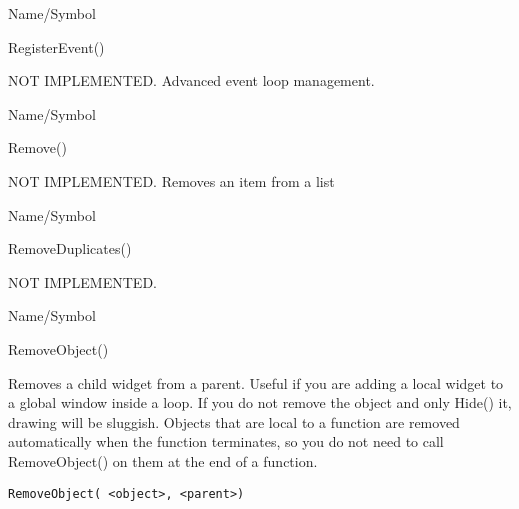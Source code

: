 \rl


\begin{desc}{Name/Symbol}
\item[Name/Symbol]  	RegisterEvent()

\item[Description]	NOT IMPLEMENTED.  Advanced event loop management.

\item[Usage]		

\item[Example]	

\item[See Also]	
\end{desc}

\rl






\begin{desc}{Name/Symbol}
\item[Name/Symbol]  	Remove()

\item[Description]  	NOT IMPLEMENTED.  Removes an item from a list

\item[Usage]		

\item[Example]	

\item[See Also]	
\end{desc}

\rl


\begin{desc}{Name/Symbol}
\item[Name/Symbol]	RemoveDuplicates()

\item[Description]	NOT IMPLEMENTED.

\item[Usage]		

\item[Example]	

\item[See Also]	 
\end{desc}

\rl


\begin{desc}{Name/Symbol}
\item[Name/Symbol]	RemoveObject()

\item[Description]  	Removes a child widget from a parent.  Useful if you are 
		adding a local widget to a global window inside a loop.  If 
		you do not remove the object and only Hide() it, drawing will 
	be sluggish.  Objects that are local to a function are removed 
	automatically when the function terminates, so you do not need 
	to call RemoveObject() on them at the end of a function.

\item[Usage]
\begin{verbatim}
RemoveObject( <object>, <parent>)
\end{verbatim}

\item[Example]	

\item[See Also]	
\end{desc}

